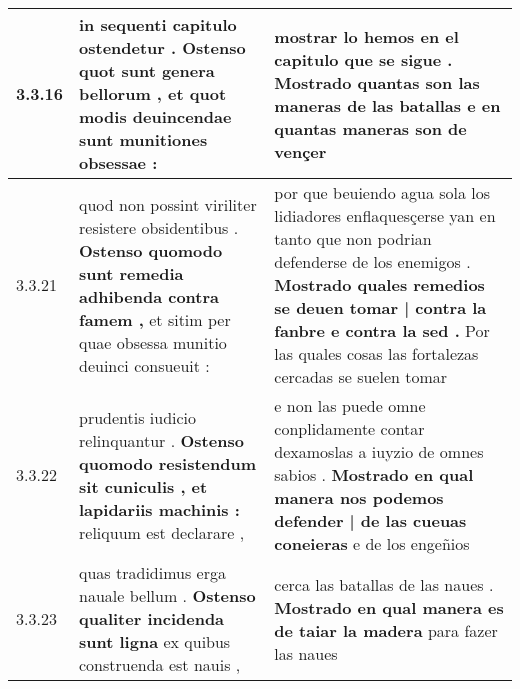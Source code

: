 \begin{tabular}{|p{1cm}|p{6.5cm}|p{6.5cm}|}
3.3.16 & in sequenti capitulo ostendetur . \textbf{ Ostenso quot sunt genera bellorum , } et quot modis deuincendae sunt munitiones obsessae : & mostrar lo hemos en el capitulo que se sigue . \textbf{ Mostrado quantas son las maneras de las batallas } e en quantas maneras son de vençer \\\hline
3.3.21 & quod non possint viriliter resistere obsidentibus . \textbf{ Ostenso quomodo sunt remedia adhibenda contra famem , } et sitim per quae obsessa munitio deuinci consueuit : & por que beuiendo agua sola los lidiadores enflaquesçerse yan en tanto que non podrian defenderse de los enemigos . \textbf{ Mostrado quales remedios se deuen tomar | contra la fanbre e contra la sed . } Por las quales cosas las fortalezas cercadas se suelen tomar \\\hline
3.3.22 & prudentis iudicio relinquantur . \textbf{ Ostenso quomodo resistendum sit cuniculis , et lapidariis machinis : } reliquum est declarare , & e non las puede omne conplidamente contar dexamoslas a iuyzio de omnes sabios . \textbf{ Mostrado en qual manera nos podemos defender | de las cueuas coneieras } e de los engeñios \\\hline
3.3.23 & quas tradidimus erga nauale bellum . \textbf{ Ostenso qualiter incidenda sunt ligna } ex quibus construenda est nauis , & cerca las batallas de las naues . \textbf{ Mostrado en qual manera es de taiar la madera } para fazer las naues \\\hline

\end{tabular}
